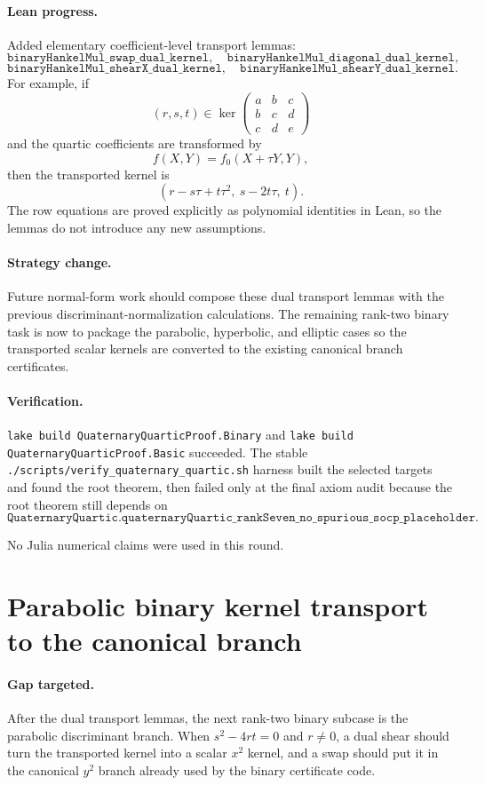 \documentclass[11pt]{article}
\begin{document}
\paragraph{Lean progress.}
Added elementary coefficient-level transport lemmas:
\[
\texttt{binaryHankelMul\_swap\_dual\_kernel},
\quad
\texttt{binaryHankelMul\_diagonal\_dual\_kernel},
\]
\[
\texttt{binaryHankelMul\_shearX\_dual\_kernel},
\quad
\texttt{binaryHankelMul\_shearY\_dual\_kernel}.
\]
For example, if
\[
(r,s,t)\in\ker
\begin{pmatrix}
a&b&c\\ b&c&d\\ c&d&e
\end{pmatrix}
\]
and the quartic coefficients are transformed by
\[
f(X,Y)=f_0(X+\tau Y,Y),
\]
then the transported kernel is
\[
(r-s\tau+t\tau^2,\ s-2t\tau,\ t).
\]
The row equations are proved explicitly as polynomial identities in Lean, so
the lemmas do not introduce any new assumptions.

\paragraph{Strategy change.}
Future normal-form work should compose these dual transport lemmas with the
previous discriminant-normalization calculations.  The remaining rank-two
binary task is now to package the parabolic, hyperbolic, and elliptic cases so
the transported scalar kernels are converted to the existing canonical branch
certificates.

\paragraph{Verification.}
\texttt{lake build QuaternaryQuarticProof.Binary} and
\texttt{lake build QuaternaryQuarticProof.Basic} succeeded.  The stable
\texttt{./scripts/verify\_quaternary\_quartic.sh} harness built the selected
targets and found the root theorem, then failed only at the final axiom audit
because the root theorem still depends on
\[
\texttt{QuaternaryQuartic.quaternaryQuartic\_rankSeven\_no\_spurious\_socp\_placeholder}.
\]

No Julia numerical claims were used in this round.

\section*{Parabolic binary kernel transport to the canonical branch}

\paragraph{Gap targeted.}
After the dual transport lemmas, the next rank-two binary subcase is the
parabolic discriminant branch.  When \(s^2-4rt=0\) and \(r\ne0\), a dual shear
should turn the transported kernel into a scalar \(x^2\) kernel, and a swap
should put it in the canonical \(y^2\) branch already used by the binary
certificate code.
\end{document}
